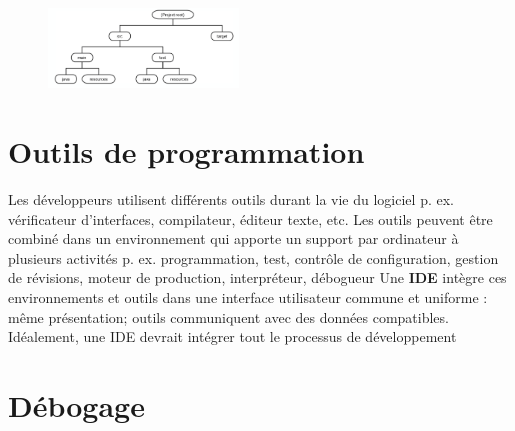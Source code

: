 \documentclass[16pt]{report}
\begin{document}
\begin{multicols*}{2}
    \begin{figure}[H]
        \begin{center}
            \includegraphics[width=0.45\textwidth]{ORganisation.png}
        \end{center}
    \end{figure}

    \section{Outils de programmation}


        Les développeurs utilisent différents outils durant la vie du logiciel
        p. ex. vérificateur d’interfaces, compilateur, éditeur texte, etc.
        Les outils peuvent être combiné dans un environnement qui apporte un support par
        ordinateur à plusieurs activités
        p. ex. programmation, test, contrôle de configuration, gestion de révisions, moteur de
        production, interpréteur, débogueur
        Une \textbf{IDE} intègre ces environnements et outils dans une interface utilisateur commune et
        uniforme : même présentation; outils communiquent avec des données compatibles.
        Idéalement, une IDE devrait intégrer tout le processus de développement


        \section{Débogage}


\end{multicols*}
\end{document}
